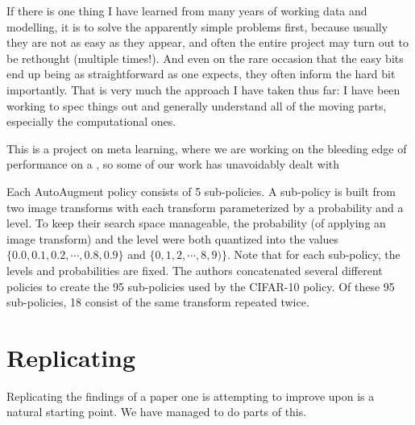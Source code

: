 \documentclass[10pt,twocolumn,letterpaper]{article}
\begin{document}
	If there is one thing I have learned from many years of working data and modelling, it is to solve the apparently simple problems first, because usually they are not as easy as they appear, and often the entire project may turn out to be rethought (multiple times!). %
	And even on the rare occasion that the easy bits end up being as straightforward as one expects, they often inform the hard bit importantly.
	That is very much the approach I have taken thus far: I have been working to spec things out and generally understand all of the moving parts, especially the computational ones. 
	
	This is a project on meta learning, where we are working on the bleeding edge of performance on a , so  some of our work has unavoidably dealt with 
	

	 
	Each AutoAugment policy consists of 5 sub-policies. A sub-policy is built from two image transforms with each transform parameterized by a probability and a level. To keep their search space manageable, the probability (of applying an image transform) and the level were both quantized into the values $\{ 0.0, 0.1, 0.2, \cdots, 0.8, 0.9\}$ and $\{0, 1, 2, \cdots, 8, 9)\}$. Note that for each sub-policy, the levels and probabilities are fixed. The authors concatenated several different policies to create the 95 sub-policies used by the CIFAR-10 policy. Of these 95 sub-policies, 18 consist of the same transform repeated twice. 
	
	
	
	
	
	

\section{Replicating \cite{Cubuk2018}}
	Replicating the findings of a paper one is attempting to improve upon is a natural starting point. We have managed to do parts of this. 
	
\end{document}
